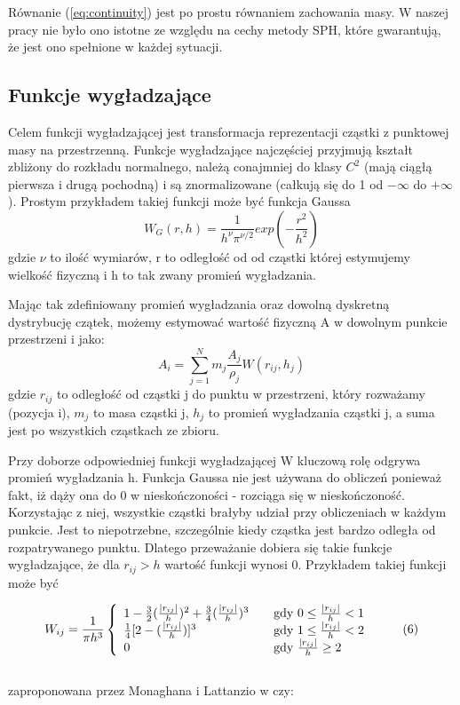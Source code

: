 \documentclass[polish, 12pt]{aghthesis}
\begin{document}
			Równanie (\ref{eq:continuity}) jest po prostu równaniem zachowania masy. W naszej pracy nie było ono istotne ze względu na cechy metody SPH, które gwarantują, że jest ono spełnione w każdej sytuacji.
			 
		\subsection{Funkcje wygładzające}
			
			Celem funkcji wygładzającej jest transformacja reprezentacji cząstki z punktowej masy na przestrzenną. Funkcje wygładzające najczęściej przyjmują kształt zbliżony do rozkładu normalnego, należą conajmniej do klasy ${C^2}$ (mają ciągłą pierwsza i drugą pochodną) i są znormalizowane (całkują się do 1 od $-{\infty}$ do $+{\infty}$). Prostym przykładem takiej funkcji może być funkcja Gaussa \[W_G(r,h)=\frac{1}{h^{\nu}\pi^{{\nu}/2}}exp(-\frac{r^2}{h^2}) \label{eq:gaussian} \tag{4}\] gdzie ${\nu}$ to ilość wymiarów, r to odległość od od cząstki której estymujemy wielkość fizyczną i h to tak zwany promień wygładzania.
			
			Mając tak zdefiniowany promień wygładzania oraz dowolną dyskretną dystrybucję czątek, możemy estymować wartość fizyczną A w dowolnym punkcie przestrzeni i jako: \[{A}_i=\sum_{j=1}^{N}m_j\frac{A_j}{\rho_j}W(r_{ij},h_j) \label{eq:calc_all} \tag{5}\] gdzie ${r_{ij}}$ to odległość od cząstki j do punktu w przestrzeni, który rozważamy (pozycja i), ${m_j}$ to masa cząstki j, ${h_j}$ to promień wygładzania cząstki j, a suma jest po wszystkich cząstkach ze zbioru. 
			
			
			Przy doborze odpowiedniej funkcji wygładzającej W kluczową rolę odgrywa promień wygładzania h. Funkcja Gaussa nie jest używana do obliczeń ponieważ fakt, iż dąży ona do 0 w nieskończoności - rozciąga się w nieskończoność. Korzystając z niej, wszystkie cząstki brałyby udział przy obliczeniach w każdym punkcie. Jest to niepotrzebne, szczególnie kiedy cząstka jest bardzo odległa od rozpatrywanego punktu. Dlatego przeważanie dobiera się takie funkcje wygładzające, że dla ${r_{ij} > h}$ wartość funkcji wynosi 0. Przykładem takiej funkcji może być
			
			\[ W_{ij} = \frac{1}{\pi h^3} \left\{ 
				\begin{array}{l l l}
					1 - \frac{3}{2}(\frac{|r_{ij}|}{h})^2 + \frac{3}{4}(\frac{|r_{ij}|}{h})^3  & \quad \text{gdy ${0 \leq \frac{|r_{ij}|}{h} < 1}$}  \\ 
					\frac{1}{4}[2 - (\frac{|r_{ij}|}{h})]^3  & \quad \text{gdy ${1 \leq \frac{|r_{ij}|}{h} < 2}$}  \\ 
					0 & \quad \text{gdy ${\frac{|r_{ij}|}{h} \geq 2 }$} 
				\end{array} \right.\ \label{eq:kernel_function} \tag{6}\]
			\ \\
			zaproponowana przez Monaghana i Lattanzio w \cite{MonLat} czy:
			
\end{document}
